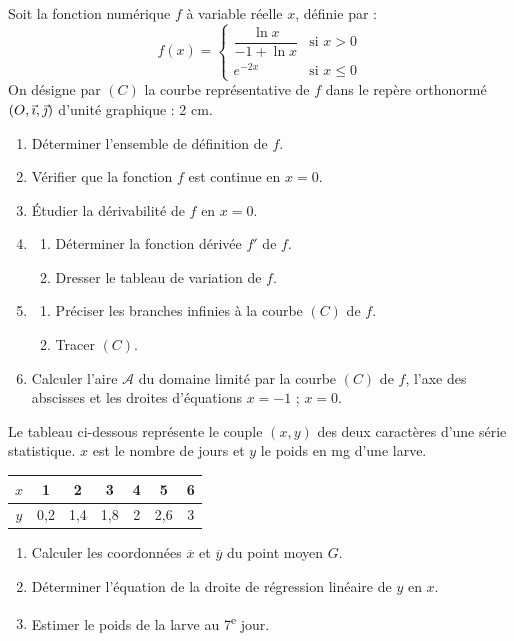 \documentclass[11pt]{article}
\begin{document}

Soit la fonction numérique $f$ à variable réelle $x$, définie par :
\[ f(x) = \begin{cases} \dfrac{\ln x}{-1 + \ln x} & \text{si } x > 0 \\[1.5ex] e^{-2x} & \text{si } x \le 0 \end{cases} \]
On désigne par $(C)$ la courbe représentative de $f$ dans le repère orthonormé $(O,\vec{\imath},\vec{\jmath})$ d'unité graphique : 2 cm.

\begin{enumerate}
  \item Déterminer l'ensemble de définition de $f$.
  \item Vérifier que la fonction $f$ est continue en $x = 0$.
  \item Étudier la dérivabilité de $f$ en $x = 0$.
  \item \begin{enumerate}[label=\alph*.]
    \item Déterminer la fonction dérivée $f'$ de $f$.
    \item Dresser le tableau de variation de $f$.
  \end{enumerate}
  \item \begin{enumerate}[label=\alph*.]
    \item Préciser les branches infinies à la courbe $(C)$ de $f$.
    \item Tracer $(C)$.
  \end{enumerate}
  \item Calculer l'aire $\mathcal{A}$ du domaine limité par la courbe $(C)$ de $f$, l'axe des abscisses et les droites d'équations $x = -1$ ; $x = 0$.
\end{enumerate}


Le tableau ci-dessous représente le couple $(x, y)$ des deux caractères d'une série statistique. $x$ est le nombre de jours et $y$ le poids en mg d'une larve.

\begin{center}
\renewcommand{\arraystretch}{1.3}
\begin{tabular}{|c|c|c|c|c|c|c|}
\hline
$x$ & 1 & 2 & 3 & 4 & 5 & 6 \\
\hline
$y$ & 0,2 & 1,4 & 1,8 & 2 & 2,6 & 3 \\
\hline
\end{tabular}
\end{center}

\begin{enumerate}
  \item Calculer les coordonnées $\overline{x}$ et $\overline{y}$ du point moyen $G$.
  \item Déterminer l'équation de la droite de régression linéaire de $y$ en $x$.
  \item Estimer le poids de la larve au 7\textsuperscript{e} jour.
\end{enumerate}
\end{document}
